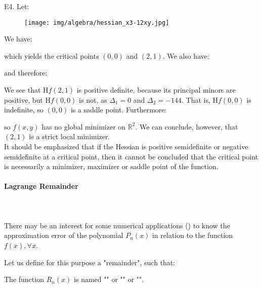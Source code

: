 	\begin{tcolorbox}[colframe=black,colback=white,sharp corners]
	E4. Let:
	
	\begin{figure}[H]
		\centering
		\texttt{[image: img/algebra/hessian\_x3-12xy.jpg]}
	\end{figure}
	We have:
	
	which yields the critical points $(0, 0)$ and $(2, 1)$. We also have:
	
	and therefore:
	
	We see that $\mathrm{H}f(2, 1)$ is positive definite, because its principal minors are positive, but $\mathrm{H}f(0, 0)$ is not, as $\Delta_1 = 0$ and $\Delta_2 = -144$. That is, $\mathrm{H}f(0, 0)$ is indefinite, so $(0, 0)$ is a saddle point.
	\newline
	Furthermore:
	
	so $f(x, y)$ has no global minimizer on $\mathds{R}^2$. We can conclude, however, that $(2, 1)$ is a strict local minimizer.\\
	
	It should be emphasized that if the Hessian is positive semidefinite or negative semidefinite at a critical point, then it cannot be concluded that the critical point is necessarily a minimizer, maximizer or saddle point of the function.
	\end{tcolorbox}
	
	
	\paragraph{Lagrange Remainder}\label{Lagrange Remainder}\mbox{}\\\\
	There may be an interest for some numerical applications () to know the approximation error of the polynomial $P_n(x)$ in relation to the function $f(x), \forall x$.
	
	Let us define for this purpose a "remainder", such that:
	
	\begin{theorem}
	The function $R_n(x)$ is named "" or "" or "".
	
	\end{theorem}
	
